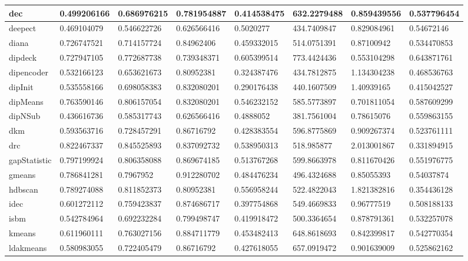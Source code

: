 \begin{table}[H]
\begin{tabular}{|l|l|l|l|l|l|l|l|}
\hline
dec & 0.499206166 & 0.686976215 & 0.781954887 & 0.414538475 & 632.2279488 & 0.859439556 & 0.537796454 \\
\hline
deepect & 0.469104079 & 0.546622726 & 0.626566416 & 0.5020277 & 434.7409847 & 0.829084961 & 0.54672146 \\
\hline
diana & 0.726747521 & 0.714157724 & 0.84962406 & 0.459332015 & 514.0751391 & 0.87100942 & 0.534470853 \\
\hline
dipdeck & 0.727947105 & 0.772687738 & 0.739348371 & 0.605399514 & 773.4424436 & 0.553104298 & 0.643871761 \\
\hline
dipencoder & 0.532166123 & 0.653621673 & 0.80952381 & 0.324387476 & 434.7812875 & 1.134304238 & 0.468536763 \\
\hline
dipInit & 0.535558166 & 0.698058383 & 0.832080201 & 0.290176438 & 440.1607509 & 1.40939165 & 0.415042527 \\
\hline
dipMeans & 0.763590146 & 0.806157054 & 0.832080201 & 0.546232152 & 585.5773897 & 0.701811054 & 0.587609299 \\
\hline
dipNSub & 0.436616736 & 0.585317743 & 0.626566416 & 0.4888052 & 381.7561004 & 0.78615076 & 0.559863155 \\
\hline
dkm & 0.593563716 & 0.728457291 & 0.86716792 & 0.428383554 & 596.8775869 & 0.909267374 & 0.523761111 \\
\hline
drc & 0.822467337 & 0.845525893 & 0.837092732 & 0.538950313 & 518.985877 & 2.013001867 & 0.331894915 \\
\hline
gapStatistic & 0.797199924 & 0.806358088 & 0.869674185 & 0.513767268 & 599.8663978 & 0.811670426 & 0.551976775 \\
\hline
gmeans & 0.786841281 & 0.7967952 & 0.912280702 & 0.484476234 & 496.4324688 & 0.85055393 & 0.54037874 \\
\hline
hdbscan & 0.789274088 & 0.811852373 & 0.80952381 & 0.556958244 & 522.4822043 & 1.821382816 & 0.354436128 \\
\hline
idec & 0.601272112 & 0.759423837 & 0.874686717 & 0.397754868 & 549.4669833 & 0.96777519 & 0.508188133 \\
\hline
isbm & 0.542784964 & 0.692232284 & 0.799498747 & 0.419918472 & 500.3364654 & 0.878791361 & 0.532257078 \\
\hline
kmeans & 0.611960111 & 0.763027156 & 0.884711779 & 0.453482413 & 648.8618693 & 0.842399817 & 0.542770354 \\
\hline
ldakmeans & 0.580983055 & 0.722405479 & 0.86716792 & 0.427618055 & 657.0919472 & 0.901639009 & 0.525862162 \\

\end{tabular}
\end{table}
